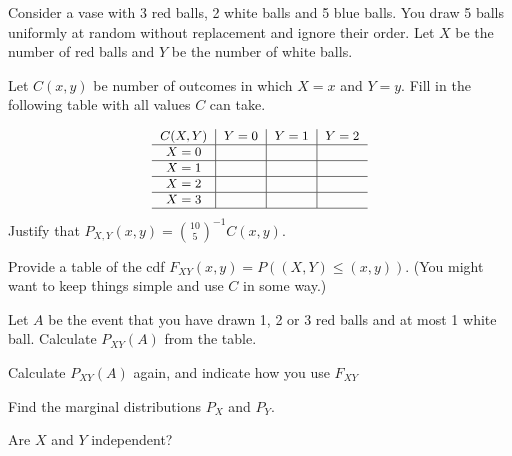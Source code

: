 \documentclass[a4paper,10pt,landscape,twocolumn]{scrartcl}
\begin{document}
\begin{exercise}
	Consider a vase with 3 red balls, 2 white balls and 5 blue balls. You draw 5 balls uniformly at random without replacement and ignore their order. Let $X$ be the number of red balls and $Y$ be the number of white balls.
	
	\begin{subex}[1pt]
		Let $C(x,y)$ be 	number of outcomes in which $X=x$ and $Y=y$. Fill in the following table with all values $C$ can take. 
		
		\[\small{
		\begin{tabular}{c|c|c|c}
		$C(X,Y)$&$Y=0$	&$Y=1$ &$Y=2$\\\hline
		$X=0$	&		&  		&\\\hline
		$X=1$	&		&		&\\\hline
		$X=2$	&		&		&\\\hline
		$X=3$	&		&		&\\\hline		
		\end{tabular}}
		\]
		Justify that $P_{X,Y}(x,y) = {10 \choose 5}^{-1} C(x,y)$.
	\end{subex}
	
	\begin{subex}[1pt]
		Provide a table of the cdf $F_{XY}(x,y) = P((X,Y) \le (x,y))$. (You might want to keep things simple and use $C$ in some way.)	
	\end{subex}
	
	\begin{subex}[0.5pt]
		Let $A$ be the event that you have drawn 1, 2 or 3 red balls and at most 1 white ball. Calculate $P_{XY}(A)$ from the table.
	\end{subex}
	
	\begin{subex}[0.5pt]
	Calculate $P_{XY}(A)$ again, and indicate how you use $F_{XY}$	
	\end{subex}

	
	\begin{subex}[0.5pt]
	Find the marginal distributions $P_X$ and $P_Y$.	
	\end{subex}
	
	\begin{subex}[0.5pt]
	Are $X$ and $Y$ independent?	
	\end{subex}
\end{exercise}
\end{document}
